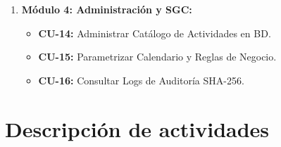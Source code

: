 \documentclass[12pt,a4paper]{article}
\begin{document}
\begin{enumerate}[leftmargin=1.5em, itemsep=2pt]
\begin{itemize}[leftmargin=1.2em]
        \item \textbf{CU-13:} Estampar Firma 2 en Cascada Final (Coord. Área de Conocimiento).
        \item \textbf{CU-20:} Estampar Firma 3 en Cascada Final (Coord. Carrera $\rightarrow$ Legalización SGC).
    \end{itemize}
    \item \textbf{Módulo 4: Administración y SGC:}
    \begin{itemize}[leftmargin=1.2em]
        \item \textbf{CU-14:} Administrar Catálogo de Actividades en BD.
        \item \textbf{CU-15:} Parametrizar Calendario y Reglas de Negocio.
        \item \textbf{CU-16:} Consultar Logs de Auditoría SHA-256.
    \end{itemize}
\end{enumerate}

\section{Descripción de actividades}
\end{document}
